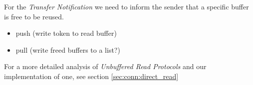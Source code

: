 For the \emph{Transfer Notification} we need to inform the sender that a specific buffer is free to be reused.

\begin{itemize}
  \item push (write token to read buffer)
  \item pull (write freed buffers to a list?)
\end{itemize}

For a more detailed analysis of \emph{Unbuffered Read Protocols} and our implementation of one, see section \ref{sec:conn:direct_read}
